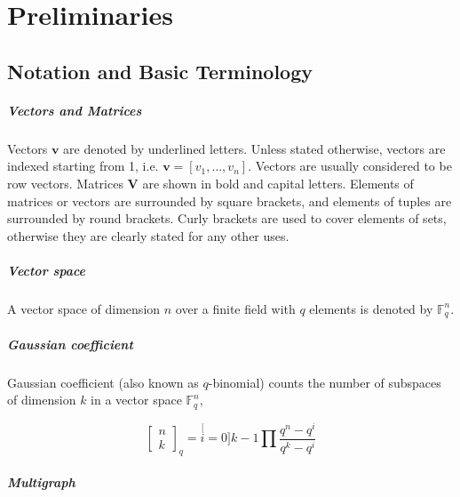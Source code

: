 \chapter{Preliminaries} \label{chap:preliminaries}

\section{Notation and Basic Terminology}

\paragraph{Vectors and Matrices}

Vectors $\boldsymbol{v}$ are denoted by underlined letters. Unless
stated otherwise, vectors are indexed starting from 1, i.e. $\boldsymbol{v}=\left[v_{1},\ldots,v_{n}\right]$.
Vectors are usually considered to be row vectors. Matrices $\boldsymbol{V}$
are shown in bold and capital letters. Elements of matrices or vectors
are surrounded by square brackets, and elements of tuples are surrounded
by round brackets. Curly brackets are used to cover elements of sets,
otherwise they are clearly stated for any other uses.

\paragraph{Vector space}

A vector space of dimension $n$ over a finite field with $q$ elements
is denoted by $\ensuremath{\mathbb{F}}_{q}^{n}$. 

\paragraph{Gaussian coefficient}

Gaussian coefficient (also known as $q$-binomial) counts the number
of subspaces of dimension $k$ in a vector space $\ensuremath{\mathbb{F}}_{q}^{n}$,

\[
\left[\begin{array}{c}
n\\
k
\end{array}\right]_{q}=\stackrel[i=0]{k-1}{\prod}\frac{q^{n}-q^{i}}{q^{k}-q^{i}}
\]


\paragraph{Multigraph}

